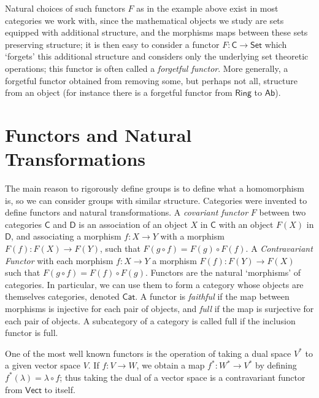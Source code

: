 Natural choices of such functors $F$ as in the example above exist in most categories we work with, since the mathematical objects we study are sets equipped with additional structure, and the morphisms maps between these sets preserving structure; it is then easy to consider a functor $F: \mathsf{C} \to \mathsf{Set}$ which `forgets' this additional structure and considers only the underlying set theoretic operations; this functor is often called a \emph{forgetful functor}. More generally, a forgetful functor obtained from removing some, but perhaps not all, structure from an object (for instance there is a forgetful functor from $\mathsf{Ring}$ to $\mathsf{Ab}$).

\section{Functors and Natural Transformations}

The main reason to rigorously define groups is to define what a homomorphism is, so we can consider groups with similar structure. Categories were invented to define functors and natural transformations. A \emph{covariant functor} $F$ between two categories $\mathsf{C}$ and $\mathsf{D}$ is an association of an object $X$ in $\mathsf{C}$ with an object $F(X)$ in $\mathsf{D}$, and associating a morphism $f: X \to Y$ with a morphism $F(f): F(X) \to F(Y)$, such that $F(g \circ f) = F(g) \circ F(f)$. A \emph{Contravariant Functor} with each morphism $f: X \to Y$ a morphism $F(f): F(Y) \to F(X)$ such that $F(g \circ f) = F(f) \circ F(g)$. Functors are the natural `morphisms' of categories. In particular, we can use them to form a category whose objects are themselves categories, denoted $\mathsf{Cat}$. A functor is \emph{faithful} if the map between morphisms is injective for each pair of objects, and \emph{full} if the map is surjective for each pair of objects. A subcategory of a category is called full if the inclusion functor is full.

\begin{example}
    One of the most well known functors is the operation of taking a dual space $V^*$ to a given vector space $V$. If $f: V \to W$, we obtain a map $f^*: W^* \to V^*$ by defining $f^*(\lambda) = \lambda \circ f$; thus taking the dual of a vector space is a contravariant functor from $\mathsf{Vect}$ to itself.
\end{example}

